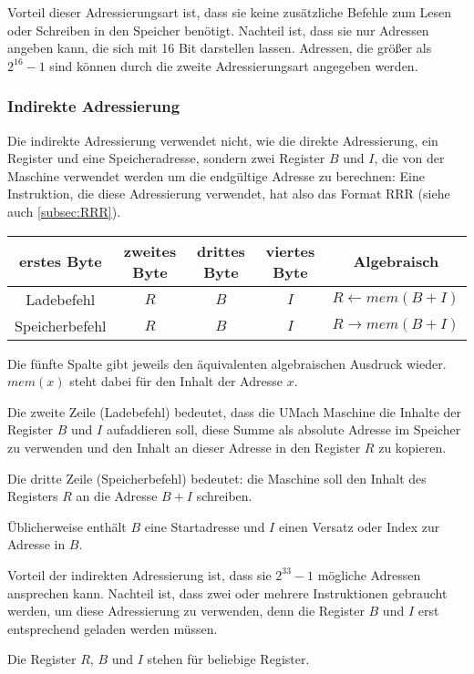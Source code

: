 Vorteil dieser Adressierungsart ist, dass sie keine zusätzliche Befehle zum
Lesen oder Schreiben in den Speicher benötigt. Nachteil ist, dass sie nur
Adressen angeben kann, die sich mit 16 Bit darstellen lassen. Adressen, die
größer als $2^{16} - 1$ sind können durch die zweite Adressierungsart angegeben
werden.


\subsubsection{Indirekte Adressierung}

Die indirekte Adressierung verwendet nicht, wie die direkte Adressierung,
ein Register und eine Speicheradresse, sondern zwei Register $B$ und $I$, die
von der Maschine verwendet werden um die endgültige Adresse zu berechnen:
Eine Instruktion, die diese Adressierung verwendet, hat also das Format RRR
(siehe auch \ref{subsec:RRR}).
\begin{center}
  \begin{tabular}{|*{4}{c|}|c|} \hline
    erstes Byte    & zweites Byte  & drittes Byte  & viertes Byte & Algebraisch
\\\hline\hline
    Ladebefehl     & $R$  & $B$  & $I$  & $R \gets mem(B + I)$ \\\hline
    Speicherbefehl & $R$  & $B$  & $I$  & $R \to   mem(B + I)$ \\\hline
  \end{tabular}
\end{center}
Die fünfte Spalte gibt jeweils den äquivalenten algebraischen Ausdruck wieder.
$mem(x)$ steht dabei für den Inhalt der Adresse $x$.


Die zweite Zeile (Ladebefehl) bedeutet, dass die UMach Maschine die Inhalte der
Register $B$ und $I$ aufaddieren soll, diese Summe als absolute Adresse im
Speicher zu verwenden und den Inhalt an dieser Adresse in den Register $R$ zu
kopieren.

Die dritte Zeile (Speicherbefehl) bedeutet: die Maschine soll den Inhalt des
Registers $R$ an die Adresse $B + I$ schreiben.

Üblicherweise enthält $B$ eine Startadresse und $I$ einen Versatz oder Index zur
Adresse in $B$.

Vorteil der indirekten Adressierung ist, dass sie $2^{33} - 1$ mögliche
Adressen ansprechen kann.
Nachteil ist, dass zwei oder mehrere Instruktionen gebraucht werden, um diese
Adressierung zu verwenden, denn die Register $B$ und $I$ erst entsprechend geladen
werden müssen.

Die Register $R$, $B$ und $I$ stehen für beliebige Register.
